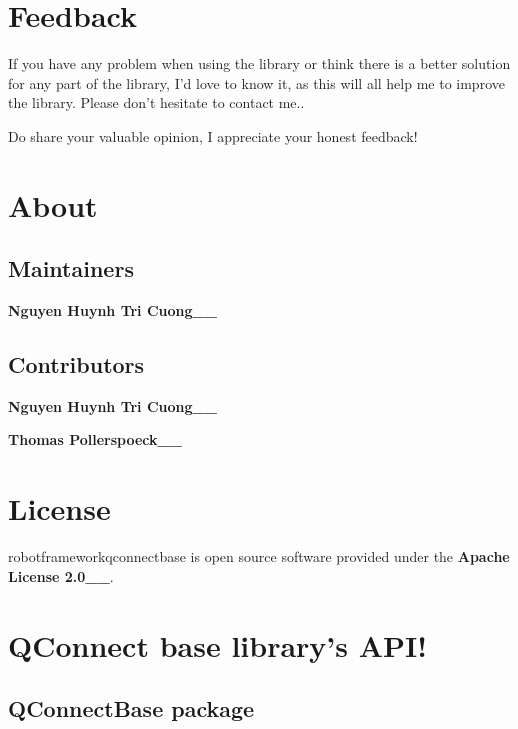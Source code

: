 \documentclass[letterpaper,10pt,english]{sphinxmanual}
\begin{document}
\chapter{Feedback}
\label{\detokenize{index:feedback}}
\sphinxAtStartPar
If you have any problem when using the library or think there is a
better solution for any part of the library, I’d love to know it, as
this will all help me to improve the library. Please don’t hesitate
to contact me..

\sphinxAtStartPar
Do share your valuable opinion, I appreciate your honest feedback!


\chapter{About}
\label{\detokenize{index:about}}

\section{Maintainers}
\label{\detokenize{index:maintainers}}
\sphinxAtStartPar
{\color{red}\bfseries{}\textasciigrave{}Nguyen Huynh Tri Cuong\textasciigrave{}\_\_}


\section{Contributors}
\label{\detokenize{index:contributors}}
\sphinxAtStartPar
{\color{red}\bfseries{}\textasciigrave{}Nguyen Huynh Tri Cuong\textasciigrave{}\_\_}

\sphinxAtStartPar
{\color{red}\bfseries{}\textasciigrave{}Thomas Pollerspoeck\textasciigrave{}\_\_}


\chapter{License}
\label{\detokenize{index:license}}
\sphinxAtStartPar
robotframework\sphinxhyphen{}qconnect\sphinxhyphen{}base is open source software provided under the {\color{red}\bfseries{}\textasciigrave{}Apache License
2.0\textasciigrave{}\_\_}.


\chapter{QConnect base library’s API!}
\label{\detokenize{index:qconnect-base-library-s-api}}

\section{QConnectBase package}
\label{\detokenize{QConnectBase:qconnectbase-package}}\label{\detokenize{QConnectBase::doc}}
\end{document}
